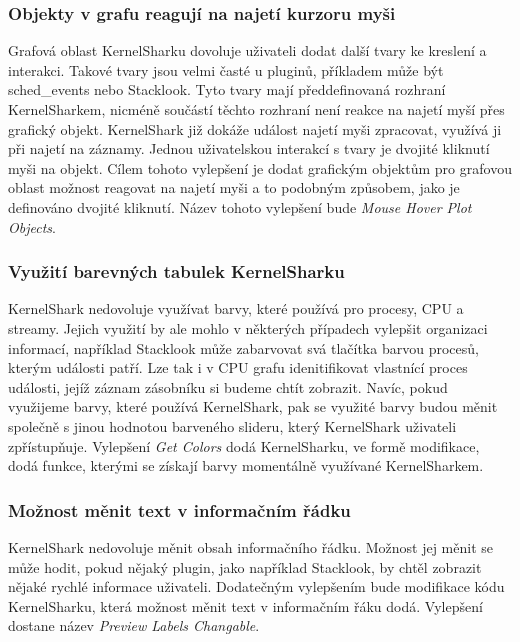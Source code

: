 \subsubsection*{Objekty v grafu reagují na najetí kurzoru myši}
Grafová oblast KernelSharku dovoluje uživateli dodat další tvary ke kreslení a interakci. Takové tvary jsou velmi časté u pluginů, příkladem může být sched\_events nebo Stacklook. Tyto tvary mají předdefinovaná rozhraní KernelSharkem, nicméně součástí těchto rozhraní není reakce na najetí myší přes grafický objekt. KernelShark již dokáže událost najetí myši zpracovat, využívá ji při najetí na záznamy. Jednou uživatelskou interakcí s tvary je dvojité kliknutí myši na objekt. Cílem tohoto vylepšení je dodat grafickým objektům pro grafovou oblast možnost reagovat na najetí myši a to podobným způsobem, jako je definováno dvojité kliknutí. Název tohoto vylepšení bude \emph{Mouse Hover Plot Objects}.

\subsubsection*{Využití barevných tabulek KernelSharku}
KernelShark nedovoluje využívat barvy, které používá pro procesy, CPU a streamy. Jejich využití by ale mohlo v některých případech vylepšit organizaci informací, například Stacklook může zabarvovat svá tlačítka barvou procesů, kterým události patří. Lze tak i v CPU grafu idenitifikovat vlastnící proces události, jejíž záznam zásobníku si budeme chtít zobrazit. Navíc, pokud využijeme barvy, které používá KernelShark, pak se využité barvy budou měnit společně s jinou hodnotou barveného slideru, který KernelShark uživateli zpřístupňuje. Vylepšení \emph{Get Colors} dodá KernelSharku, ve formě modifikace, dodá funkce, kterými se získají barvy momentálně využívané KernelSharkem.

\subsubsection*{Možnost měnit text v informačním řádku}
KernelShark nedovoluje měnit obsah informačního řádku. Možnost jej měnit se může hodit, pokud nějaký plugin, jako například Stacklook, by chtěl zobrazit nějaké rychlé informace uživateli. Dodatečným vylepšením bude modifikace kódu KernelSharku, která možnost měnit text v informačním řáku dodá. Vylepšení dostane název \emph{Preview Labels Changable}.

